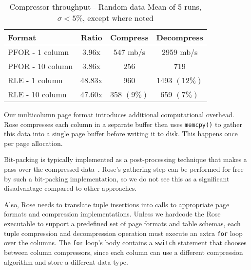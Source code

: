 \documentclass{vldb}
\newcommand{\rows}{Rose\xspace}
\newcommand{\rowss}{Rose's\xspace}
\begin{document}



\begin{table}
\caption{Compressor throughput - Random data Mean of 5 runs, $\sigma<5\%$, except where noted}
\centering
\label{table:perf}
\begin{tabular}{|l|c|c|c|} \hline
Format        & Ratio & Compress  & Decompress\\ \hline %
PFOR - 1 column    &    3.96x  &  547 mb/s &    2959 mb/s \\ \hline %
PFOR - 10 column   &    3.86x  &  256 &      719 \\ \hline %
RLE - 1 column     &   48.83x  &  960  &    1493 $(12\%)$ \\ \hline %
RLE - 10 column    &   47.60x  &  358 $(9\%)$ & 659 $(7\%)$ \\  %
\hline\end{tabular}
\end{table}


Our multicolumn page format introduces additional computational
overhead.  \rows compresses each column in a separate buffer then uses
{\tt memcpy()} to gather this data into a single page buffer before
writing it to disk.  This happens once per page allocation.

Bit-packing is typically implemented as a post-processing
technique that makes a pass over the compressed data~\cite{pfor}.  \rowss
gathering step can be performed for free by such a bit-packing
implementation, so we do not see this as a significant disadvantage
compared to other approaches.

Also, \rows needs to translate tuple insertions into
calls to appropriate page formats and compression implementations.
Unless we hardcode the \rows executable to support a predefined set of
page formats and table schemas, each tuple compression and decompression operation must execute an extra {\tt for} loop
over the columns.  The {\tt for} loop's body contains a {\tt switch} statement that chooses between column compressors, since each column can use a different compression algorithm and store a different data type.
\end{document}
